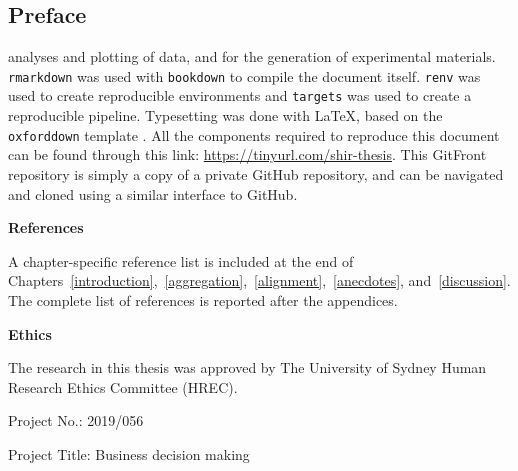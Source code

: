 \documentclass[a4paper, nobind]{templates/ociamthesis}
\newenvironment{preface}%
{   \begin{alwayssingle}\chapter*{Preface}
    \thispagestyle{empty}
    \pagestyle{empty}
    \setlength{\baselineskip}{\frontmatterbaselineskip}
  }
  {\end{alwayssingle}}
\theoremstyle{definition}
\theoremstyle{definition}
\theoremstyle{definition}
\theoremstyle{definition}
\theoremstyle{remark}
\begin{document}
\begin{romanpages}
\begin{preface}
  analyses and plotting of data, and for the generation of experimental materials.
  \texttt{rmarkdown} \autocite{xie2018} was used with \texttt{bookdown} \autocite{xie2016} to compile the
  document itself. \texttt{renv} \autocite{ushey2021} was used to create reproducible
  environments and \texttt{targets} \autocite{landau2021} was used to create a reproducible
  pipeline. Typesetting was done with \LaTeX, based on the \texttt{oxforddown} template
  \autocite{lyngs2019}. All the components required to reproduce this document can be
  found through this link: \url{https://tinyurl.com/shir-thesis}. This GitFront
  repository is simply a copy of a private GitHub repository, and can be navigated
  and cloned using a similar interface to GitHub.

  \hfill\break

  \noindent \textbf{References}

  A chapter-specific reference list is included at the end of
  Chapters~\ref{introduction},~\ref{aggregation},~\ref{alignment},~\ref{anecdotes},
  and~\ref{discussion}. The complete list of references is reported after the
  appendices.

  \hfill\break

  \noindent \textbf{Ethics}

  The research in this thesis was approved by The University of Sydney Human
  Research Ethics Committee (HREC).

  Project No.: 2019/056

  Project Title: Business decision making
\end{preface}


\end{romanpages}
\end{document}
